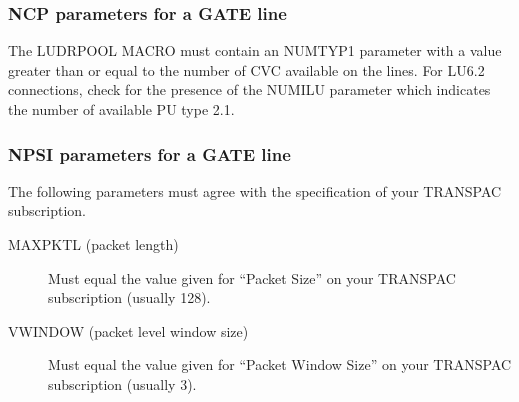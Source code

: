 \documentclass[letterpaper,10pt,english]{sphinxmanual}
\begin{document}
\subsubsection{NCP parameters for a GATE line}
\label{\detokenize{connectivity_guide:ncp-parameters-for-a-gate-line}}
The LUDRPOOL MACRO must contain an NUMTYP1 parameter with a value greater than or equal to the number of CVC available on the lines. For LU6.2 connections, check for the presence of the NUMILU parameter which indicates the number of available PU type 2.1.


\subsubsection{NPSI parameters for a GATE line}
\label{\detokenize{connectivity_guide:npsi-parameters-for-a-gate-line}}
The following parameters must agree with the specification of your TRANSPAC subscription.

\begin{description}
\item[{MAXPKTL (packet length)}] \leavevmode
Must equal the value given for “Packet Size” on your TRANSPAC subscription (usually 128).

\item[{VWINDOW (packet level window size)}] \leavevmode
Must equal the value given for “Packet Window Size” on your TRANSPAC subscription (usually 3).

\end{description}
\end{document}
